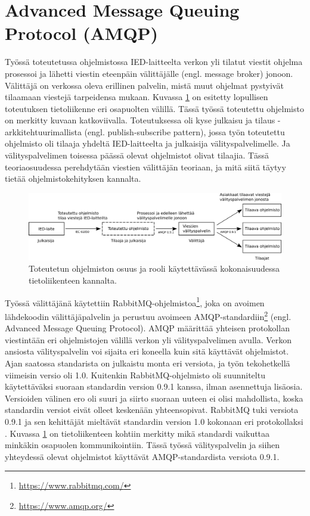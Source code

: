 \section{Advanced Message Queuing Protocol (AMQP)}
Työssä toteutetussa ohjelmistossa IED-laitteelta verkon yli tilatut viestit ohjelma prosessoi ja lähetti viestin eteenpäin välittäjälle (engl. message broker) jonoon. Välittäjä on verkossa oleva erillinen palvelin, mistä muut ohjelmat pystyivät tilaamaan viestejä tarpeidensa mukaan. Kuvassa \ref{fig:implemented-system-communication} on esitetty lopullisen toteutuksen tietoliikenne eri osapuolten välillä. Tässä työssä toteutettu ohjelmisto on merkitty kuvaan katkoviivalla. Toteutuksessa oli kyse julkaisu ja tilaus -arkkitehtuurimallista (engl. publish-subscribe pattern), jossa työn toteutettu ohjelmisto oli tilaaja yhdeltä IED-laitteelta ja julkaisija välityspalvelimelle. Ja välityspalvelimen toisessa päässä olevat ohjelmistot olivat tilaajia. Tässä teoriaosuudessa perehdytään viestien välittäjän teoriaan, ja mitä siitä täytyy tietää ohjelmistokehityksen kannalta.

\begin{figure}[ht!]
	\includegraphics[width=1\textwidth]{pictures/implemented-system-communication.png}
	\caption{Toteutetun ohjelmiston osuus ja rooli käytettävässä kokonaisuudessa tietoliikenteen kannalta.}
	\label{fig:implemented-system-communication}
\end{figure}

Työssä välittäjänä käytettiin RabbitMQ-ohjelmistoa\footnote{\url{https://www.rabbitmq.com/}}, joka on avoimen lähdekoodin välittäjäpalvelin ja perustuu avoimeen AMQP-standardiin\footnote{\url{https://www.amqp.org/}} (engl. Advanced Message Queuing Protocol). AMQP määrittää yhteisen protokollan viestintään eri ohjelmistojen välillä verkon yli välityspalvelimen avulla. Verkon ansiosta välityspalvelin voi sijaita eri koneella kuin sitä käyttävät ohjelmistot. Ajan saatossa standarista on julkaistu monta eri versiota, ja työn tekohetkellä viimeisin versio oli 1.0. Kuitenkin RabbitMQ-ohjelmisto oli suunniteltu käytettäväksi suoraan standardin version 0.9.1 kanssa, ilman asennettuja lisäosia. Versioiden välinen ero oli suuri ja siirto suoraan uuteen ei olisi mahdollista, koska standardin versiot eivät olleet keskenään yhteensopivat. RabbitMQ tuki versiota 0.9.1 ja sen kehittäjät mieltävät standardin version 1.0 kokonaan eri protokollaksi \cite{RabbitMQ-Compatibility-and-Conformance}. Kuvassa \ref{fig:implemented-system-communication} on tietoliikenteen kohtiin merkitty mikä standardi vaikuttaa minkäkin osapuolen kommunikointiin. Tässä työssä välityspalvelin ja siihen yhteydessä olevat ohjelmistot käyttävät AMQP-standardista versiota 0.9.1.


